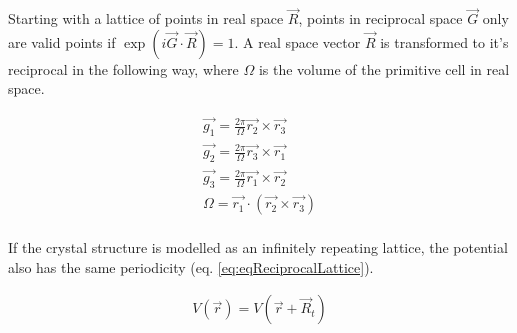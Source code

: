 
Starting with a lattice of points in real space $\vec{R}$, points in reciprocal space $\vec{G}$ only are valid points if $\exp(i \vec{G} \cdot \vec{R}) = 1$\cite{solidstatebasics}.  A real space vector $\vec{R}$ is transformed to it's reciprocal in the following way, where $\Omega$ is the volume of the primitive cell in real space.

\begin{equation}
  \begin{split}
    \vec{g_1} = \frac{2 \pi}{\Omega} \vec{r_2} \times \vec{r_3} \\
    \vec{g_2} = \frac{2 \pi}{\Omega} \vec{r_3} \times \vec{r_1} \\
    \vec{g_3} = \frac{2 \pi}{\Omega} \vec{r_1} \times \vec{r_2} \\
    \Omega = \vec{r_1} \cdot (\vec{r_2} \times \vec{r_3}) \\
  \end{split}
  \label{eq:eqReciprocalLattice}
\end{equation}

If the crystal structure is modelled as an infinitely repeating lattice, the potential also has the same periodicity (eq. \ref{eq:eqReciprocalLattice}).

\begin{equation}
  \begin{split}
    V(\vec{r}) = V(\vec{r} + \vec{R}_{t}) 
  \end{split}
  \label{eq:eqPeriodicPotential1}
\end{equation}

